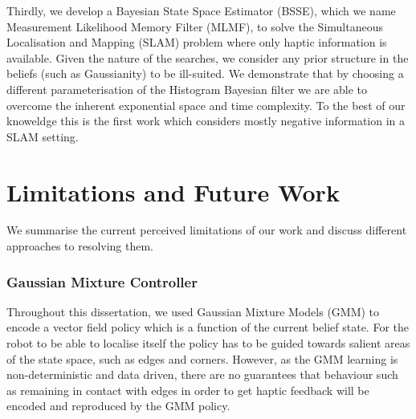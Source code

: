 Thirdly, we develop a Bayesian State Space Estimator (BSSE), which we name Measurement Likelihood Memory Filter (MLMF), to solve 
the Simultaneous Localisation and Mapping (SLAM) problem where only haptic information is available. 
Given the nature of the searches, we consider any prior structure in the beliefs (such as Gaussianity) to be 
ill-suited. We demonstrate that by choosing a different parameterisation of the Histogram Bayesian filter we are able 
to overcome the inherent exponential space and time complexity. To the best of our knoweldge this is 
the first work which considers mostly negative information in a SLAM setting.





\section{Limitations and Future Work}

We summarise the current perceived limitations of our work and discuss different approaches to 
resolving them.

\subsubsection{Gaussian Mixture Controller}
%
%
Throughout this dissertation, we used Gaussian Mixture Models (GMM) to encode a vector 
field policy which is a function of the current belief state. For the robot to be able to localise 
itself the policy has to be guided towards salient areas of the state space, such as edges and corners. 
However, as the GMM learning is non-deterministic and data driven, there are no guarantees that 
behaviour such as remaining in contact with edges in order to get haptic feedback 
will be encoded and reproduced by the GMM policy. 


